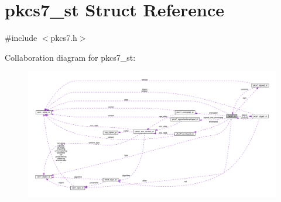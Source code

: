 \hypertarget{structpkcs7__st}{}\section{pkcs7\+\_\+st Struct Reference}
\label{structpkcs7__st}


{\ttfamily \#include $<$pkcs7.\+h$>$}



Collaboration diagram for pkcs7\+\_\+st\+:\nopagebreak
\begin{figure}[H]
\begin{center}
\leavevmode
\includegraphics[width=350pt]{structpkcs7__st__coll__graph}
\end{center}
\end{figure}
